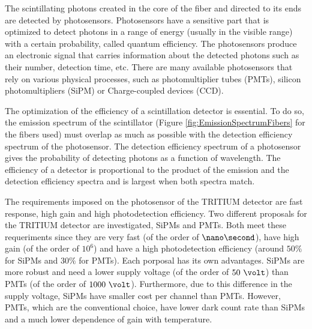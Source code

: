 The scintillating photons created in the core of the fiber and directed to its ends are detected by photosensors. Photosensors have a sensitive part that is optimized to detect photons in a range of energy (usually in the visible range) with a certain probability, called quantum efficiency. The photosensors produce an electronic signal that carries information about the detected photons such as their number, detection time, etc. There are many available photosensors that rely on various physical processes, such as photomultiplier tubes (PMTs), silicon photomultipliers (SiPM) or Charge-coupled devices (CCD).  %

The optimization of the efficiency of a scintillation detector is essential. To do so, the emission spectrum of the scintillator (Figure \ref{fig:EmissionSpectrumFibers} for the fibers used) must overlap as much as possible with the detection efficiency spectrum of the photosensor. The detection efficiency spectrum of a photosensor gives the probability of detecting photons as a function of wavelength. The efficiency of a detector is proportional to the product of the emission and the detection efficiency spectra and is largest when both spectra match.

The requirements imposed on the photosensor of the TRITIUM detector are fast response, high gain and high photodetection efficiency. Two different proposals for the TRITIUM detector are investigated, SiPMs and PMTs. Both meet these requeriments since they are very fast (of the order of $\nano\second$), have high gain (of the order of $10^{6}$) and have a high photodetection efficiency (around $50\%$ for SiPMs and $30\%$ for PMTs). Each porposal has its own advantages. SiPMs are more robust and need a lower supply voltage (of the order of $50~\volt$) than PMTs (of the order of $1000~\volt$). Furthermore, due to this difference in the supply voltage, SiPMs have smaller cost per channel than PMTs. However, PMTs, which are the conventional choice, have lower dark count rate than SiPMs and a much lower dependence of gain with temperature.


